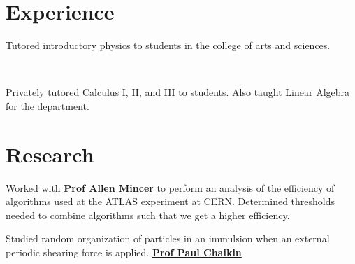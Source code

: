 \documentclass[]{deedy-resume-openfont}
\begin{document}
\begin{minipage}[t]{0.66\textwidth} 


\section{Experience}

\vspace{\topsep} %
\begin{tightemize}\item Tutored introductory physics to students in the college of arts
and sciences. 
\end{tightemize}
\sectionsep

\\
\begin{tightemize}
\item Privately tutored Calculus I, II, and III to students. Also taught Linear Algebra for the department. 
\end{tightemize}
\sectionsep


\section{Research}
Worked with \textbf{\href{https://as.nyu.edu/content/nyu-as/as/faculty/allen-mincer.html}{Prof Allen Mincer}} 
to perform an analysis of the efficiency of algorithms used at the ATLAS experiment at CERN. 
Determined thresholds needed to combine algorithms such that we get a higher efficiency. 
\sectionsep

Studied random organization of particles in an immulsion when an external periodic shearing force is applied.
\textbf{\href{http://www.physics.nyu.edu/~pc86/people/chaikin.html}{Prof Paul Chaikin}} 
\sectionsep


\end{minipage}
\end{document}

